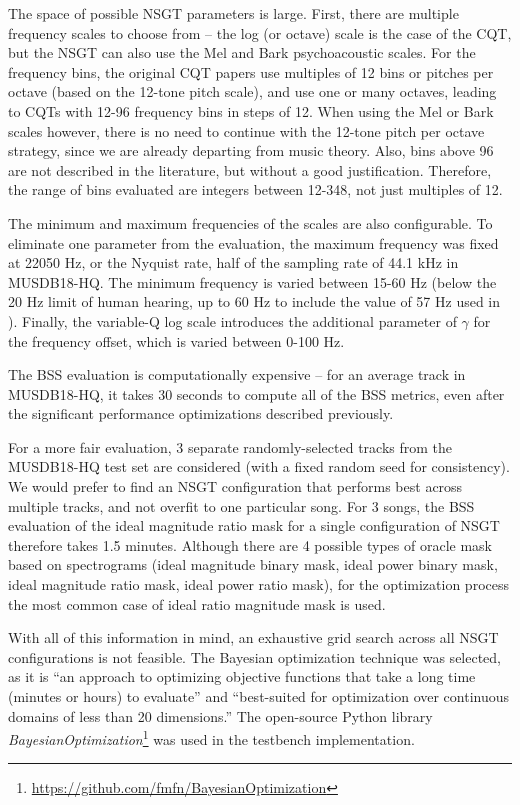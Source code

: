 \documentclass[letter,12pt,notitlepage]{article}
\begin{document}
The space of possible NSGT parameters is large. First, there are multiple frequency scales to choose from -- the log (or octave) scale is the case of the CQT, but the NSGT can also use the Mel and Bark psychoacoustic scales. For the frequency bins, the original CQT papers \cite{klapuricqt, invertiblecqt} use multiples of 12 bins or pitches per octave (based on the 12-tone pitch scale), and use one or many octaves, leading to CQTs with 12-96 frequency bins in steps of 12. When using the Mel or Bark scales however, there is no need to continue with the 12-tone pitch per octave strategy, since we are already departing from music theory. Also, bins above 96 are not described in the literature, but without a good justification. Therefore, the range of bins evaluated are integers between 12-348, not just multiples of 12.

The minimum and maximum frequencies of the scales are also configurable. To eliminate one parameter from the evaluation, the maximum frequency was fixed at 22050 Hz, or the Nyquist rate, half of the sampling rate of 44.1 kHz in MUSDB18-HQ. The minimum frequency is varied between 15-60 Hz (below the 20 Hz limit of human hearing, up to 60 Hz to include the value of 57 Hz used in \cite{klapuricqt}). Finally, the variable-Q log scale introduces the additional parameter of $\gamma$ for the frequency offset, which is varied between 0-100 Hz.

The BSS evaluation is computationally expensive -- for an average track in MUSDB18-HQ, it takes 30 seconds to compute all of the BSS metrics, even after the significant performance optimizations described previously.


For a more fair evaluation, 3 separate randomly-selected tracks from the MUSDB18-HQ test set are considered (with a fixed random seed for consistency). We would prefer to find an NSGT configuration that performs best across multiple tracks, and not overfit to one particular song. For 3 songs, the BSS evaluation of the ideal magnitude ratio mask for a single configuration of NSGT therefore takes 1.5 minutes. Although there are 4 possible types of oracle mask based on spectrograms (ideal magnitude binary mask, ideal power binary mask, ideal magnitude ratio mask, ideal power ratio mask), for the optimization process the most common case of ideal ratio magnitude mask is used.

With all of this information in mind, an exhaustive grid search across all NSGT configurations is not feasible. The Bayesian optimization technique \cite{bayesian} was selected, as it is ``an approach to optimizing objective functions that take a long time (minutes or hours) to evaluate'' and ``best-suited for optimization over continuous domains of less than 20 dimensions.'' The open-source Python library \textit{BayesianOptimization}\footnote{\href{https://github.com/fmfn/BayesianOptimization}{https://github.com/fmfn/BayesianOptimization}} was used in the testbench implementation.
\end{document}
